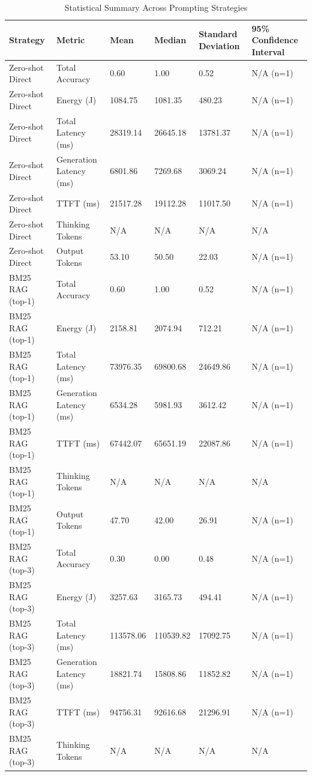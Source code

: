\begin{table}
\caption{Statistical Summary Across Prompting Strategies}
\label{tab:statistical_summary}
\begin{tabular}{llllll}
\toprule
Strategy & Metric & Mean & Median & Standard Deviation & 95\% Confidence Interval \\
\midrule
Zero-shot Direct & Total Accuracy & 0.60 & 1.00 & 0.52 & N/A (n=1) \\
Zero-shot Direct & Energy (J) & 1084.75 & 1081.35 & 480.23 & N/A (n=1) \\
Zero-shot Direct & Total Latency (ms) & 28319.14 & 26645.18 & 13781.37 & N/A (n=1) \\
Zero-shot Direct & Generation Latency (ms) & 6801.86 & 7269.68 & 3069.24 & N/A (n=1) \\
Zero-shot Direct & TTFT (ms) & 21517.28 & 19112.28 & 11017.50 & N/A (n=1) \\
Zero-shot Direct & Thinking Tokens & N/A & N/A & N/A & N/A \\
Zero-shot Direct & Output Tokens & 53.10 & 50.50 & 22.03 & N/A (n=1) \\
BM25 RAG (top-1) & Total Accuracy & 0.60 & 1.00 & 0.52 & N/A (n=1) \\
BM25 RAG (top-1) & Energy (J) & 2158.81 & 2074.94 & 712.21 & N/A (n=1) \\
BM25 RAG (top-1) & Total Latency (ms) & 73976.35 & 69800.68 & 24649.86 & N/A (n=1) \\
BM25 RAG (top-1) & Generation Latency (ms) & 6534.28 & 5981.93 & 3612.42 & N/A (n=1) \\
BM25 RAG (top-1) & TTFT (ms) & 67442.07 & 65651.19 & 22087.86 & N/A (n=1) \\
BM25 RAG (top-1) & Thinking Tokens & N/A & N/A & N/A & N/A \\
BM25 RAG (top-1) & Output Tokens & 47.70 & 42.00 & 26.91 & N/A (n=1) \\
BM25 RAG (top-3) & Total Accuracy & 0.30 & 0.00 & 0.48 & N/A (n=1) \\
BM25 RAG (top-3) & Energy (J) & 3257.63 & 3165.73 & 494.41 & N/A (n=1) \\
BM25 RAG (top-3) & Total Latency (ms) & 113578.06 & 110539.82 & 17092.75 & N/A (n=1) \\
BM25 RAG (top-3) & Generation Latency (ms) & 18821.74 & 15808.86 & 11852.82 & N/A (n=1) \\
BM25 RAG (top-3) & TTFT (ms) & 94756.31 & 92616.68 & 21296.91 & N/A (n=1) \\
BM25 RAG (top-3) & Thinking Tokens & N/A & N/A & N/A & N/A \\

\end{tabular}
\end{table}
